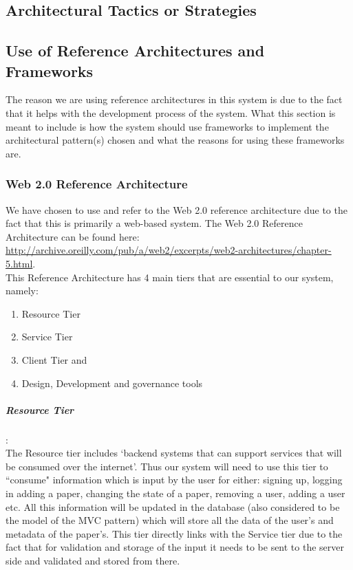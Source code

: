 \documentclass[a4paper,12pt]{article}
\begin{document}
\subsection{Architectural Tactics or Strategies}

\subsection{Use of Reference Architectures and Frameworks}
The reason we are using reference architectures in this system is due to the fact that it helps with the development process of the system. What this section is meant to include is how the system should use frameworks to implement the architectural pattern(s) chosen and what the reasons for using these frameworks are.

\subsubsection{Web 2.0 Reference Architecture}
\noindent
We have chosen to use and refer to the Web 2.0 reference architecture due to the fact that this is primarily a web-based system. The Web 2.0 Reference Architecture can be found here: \url{http://archive.oreilly.com/pub/a/web2/excerpts/web2-architectures/chapter-5.html}.\\

\noindent
This Reference Architecture has 4 main tiers that are essential to our system, namely:
\begin{enumerate}
	\item Resource Tier
	\item Service Tier
	\item Client Tier and
	\item Design, Development and governance tools
\end{enumerate}

\subparagraph{Resource Tier}\hspace{-10pt}:\\
The Resource tier includes `backend systems that can support services that will be consumed over the internet'. Thus our system will need to use this tier to ``consume" information which is input by the user for either: signing up, logging in adding a paper, changing the state of a paper, removing a user, adding a user etc. All this information will be updated in the database (also considered to be the model of the MVC pattern) which will store all the data of the user's and metadata of the paper's. This tier directly links with the Service tier due to the fact that for validation and storage of the input it needs to be sent to the server side and validated and stored from there. 
\end{document}
